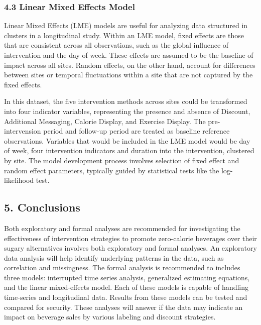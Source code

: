 \documentclass[
]{article}
\begin{document}
\hypertarget{linear-mixed-effects-model}{%
\subsubsection{4.3 Linear Mixed Effects
Model}\label{linear-mixed-effects-model}}

Linear Mixed Effects (LME) models are useful for analyzing data
structured in clusters in a longitudinal study. Within an LME model,
fixed effects are those that are consistent across all observations,
such as the global influence of intervention and the day of week. These
effects are assumed to be the baseline of impact across all sites.
Random effects, on the other hand, account for differences between sites
or temporal fluctuations within a site that are not captured by the
fixed effects.

In this dataset, the five intervention methods across sites could be
transformed into four indicator variables, representing the presence and
absence of Discount, Additional Messaging, Calorie Display, and Exercise
Display. The pre-intervension period and follow-up period are treated as
baseline reference observations. Variables that would be included in the
LME model would be day of week, four intervention indicators and
duration into the intervention, clustered by site. The model development
process involves selection of fixed effect and random effect parameters,
typically guided by statistical tests like the log-likelihood test.

\hypertarget{conclusions}{%
\subsection{5. Conclusions}\label{conclusions}}

Both exploratory and formal analyses are recommended for investigating
the effectiveness of intervention strategies to promote zero-calorie
beverages over their sugary alternatives involves both exploratory and
formal analyses. An exploratory data analysis will help identify
underlying patterns in the data, such as correlation and missingness.
The formal analysis is recommended to includes three models: interrupted
time series analysis, generalized estimating equations, and the linear
mixed-effects model. Each of these models is capable of handling
time-series and longitudinal data. Results from these models can be
tested and compared for security. These analyses will answer if the data
may indicate an impact on beverage sales by various labeling and
discount strategies.
\end{document}
